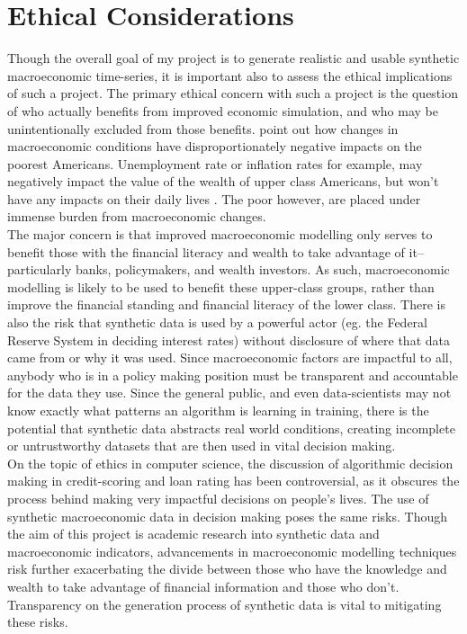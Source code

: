 \documentclass[10pt,twocolumn]{article}
\begin{document}
\section{Ethical Considerations}
Though the overall goal of my project is to generate realistic and usable synthetic macroeconomic time-series, it is important also to assess the ethical implications of such a project. The primary ethical concern with such a project is the question of who actually benefits from improved economic simulation, and who may be unintentionally excluded from those benefits.
\textcite{ravallion2021macroeconomicmisery} point out how changes in macroeconomic conditions have disproportionately negative impacts on the poorest Americans. Unemployment rate or inflation rates for example, may negatively impact the value of the wealth of upper class Americans, but won’t have any impacts on their daily lives \textcite{ravallion2021macroeconomicmisery}. The poor however, are placed under immense burden from macroeconomic changes.\\
\indent{}The major concern is that improved macroeconomic modelling only serves to benefit those with the financial literacy and wealth to take advantage of it–particularly banks, policymakers, and wealth investors. As such, macroeconomic modelling is likely to be used to benefit these upper-class groups, rather than improve the financial standing and financial literacy of the lower class.
\indent{}There is also the risk that synthetic data is used by a powerful actor (eg. the Federal Reserve System in deciding interest rates) without disclosure of where that data came from or why it was used. Since macroeconomic factors are impactful to all, anybody who is in a policy making position must be transparent and accountable for the data they use. Since the general public, and even data-scientists may not know exactly what patterns an algorithm is learning in training, there is the potential that synthetic data abstracts real world conditions, creating incomplete or untrustworthy datasets that are then used in vital decision making. \\
\indent{}On the topic of ethics in computer science, the discussion of algorithmic decision making in credit-scoring and loan rating has been controversial, as it obscures the process behind making very impactful decisions on people's lives. The use of synthetic macroeconomic data in decision making poses the same risks.
\indent{}Though the aim of this project is academic research into synthetic data and macroeconomic indicators, advancements in macroeconomic modelling techniques risk further exacerbating the divide between those who have the knowledge and wealth to take advantage of financial information and those who don’t. Transparency on the generation process of synthetic data is vital to mitigating these risks.


\printbibliography

\clearpage

\onecolumn
\end{document}
